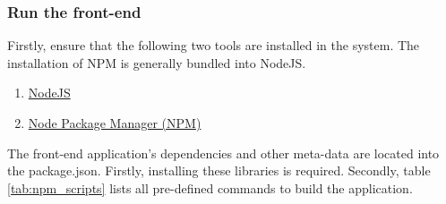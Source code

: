 \subsubsection{Run the front-end}
        Firstly, ensure that the following two tools are installed in the system. The installation of NPM is generally bundled into NodeJS.
        
        \begin{enumerate}
            \item \href{https://nodejs.org/en/}{NodeJS}
            \item \href{https://www.npmjs.com/package/npm}{Node Package Manager (NPM)}
        \end{enumerate}
        
        The front-end application's dependencies and other meta-data are located into the package.json. Firstly, installing these libraries is required. Secondly, table \ref{tab:npm_scripts} lists all pre-defined commands to build the application.
        
        

